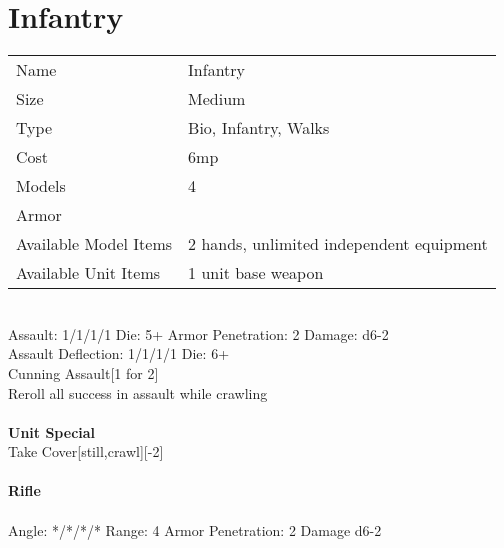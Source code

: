 \pagebreak

\section{ Infantry }

\begin{tabular}{ll}
  Name & Infantry \\
  Size & Medium\\
  Type & Bio, Infantry, Walks\\
  Cost & 6mp\\
  Models & 4\\
  Armor & \\
  Available Model Items & 2 hands, unlimited independent equipment \\
  Available Unit Items & 1 unit base weapon \\
\end{tabular}

\ \\
Assault: 1/1/1/1 Die: 5+ Armor Penetration: 2 Damage: d6-2 \\
Assault Deflection: 1/1/1/1 Die: 6+\\
\indent Cunning Assault[1 for 2]\\ Reroll all success in assault while crawling \\
\ \\

{\bf Unit Special} \\
Take Cover[still,crawl][-2]
\ \\
\ \\
{\bf Rifle } \\
\ \\
Angle: */*/*/* Range: 4 Armor Penetration: 2 Damage d6-2 \\
\indent  \\





